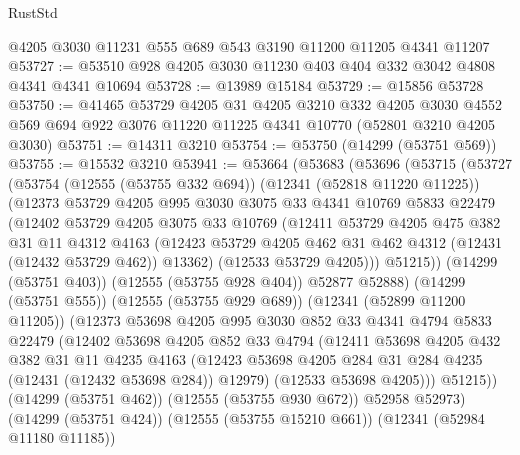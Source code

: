 \begin{lexlean}{RustStd}
\begin{coremodule}
    @4205
    @3030
    @11231
    @555
    @689
    @543
    @3190
    @11200
    @11205
    @4341
    @11207
@53727 := @53510 @928 @4205 @3030 @11230 @403 @404 @332 @3042 @4808 @4341 @4341 @10694
@53728 := @13989 @15184
@53729 := @15856 @53728
@53750 := @41465
    @53729
    @4205
    @31
    @4205
    @3210
    @332
    @4205
    @3030
    @4552
    @569
    @694
    @922
    @3076
    @11220
    @11225
    @4341
    @10770
    (@52801 @3210 @4205 @3030)
@53751 := @14311 @3210
@53754 := @53750 (@14299 (@53751 @569))
@53755 := @15532 @3210
@53941 := @53664
    (@53683
      (@53696
        (@53715
          (@53727
            (@53754
              (@12555 (@53755 @332 @694))
              (@12341 (@52818 @11220 @11225))
              (@12373
                @53729
                @4205
                @995
                @3030
                @3075
                @33
                @4341
                @10769
                @5833
                @22479
                (@12402
                  @53729
                  @4205
                  @3075
                  @33
                  @10769
                  (@12411
                    @53729
                    @4205
                    @475
                    @382
                    @31
                    @11
                    @4312
                    @4163
                    (@12423 @53729 @4205 @462 @31 @462 @4312 (@12431 (@12432 @53729 @462)) @13362)
                    (@12533 @53729 @4205)))
                @51215))
            (@14299 (@53751 @403))
            (@12555 (@53755 @928 @404))
            @52877
            @52888)
          (@14299 (@53751 @555))
          (@12555 (@53755 @929 @689))
          (@12341 (@52899 @11200 @11205))
          (@12373
            @53698
            @4205
            @995
            @3030
            @852
            @33
            @4341
            @4794
            @5833
            @22479
            (@12402
              @53698
              @4205
              @852
              @33
              @4794
              (@12411
                @53698
                @4205
                @432
                @382
                @31
                @11
                @4235
                @4163
                (@12423 @53698 @4205 @284 @31 @284 @4235 (@12431 (@12432 @53698 @284)) @12979)
                (@12533 @53698 @4205)))
            @51215))
        (@14299 (@53751 @462))
        (@12555 (@53755 @930 @672))
        @52958
        @52973)
      (@14299 (@53751 @424))
      (@12555 (@53755 @15210 @661))
      (@12341 (@52984 @11180 @11185))

\end{coremodule}
\end{lexlean}
